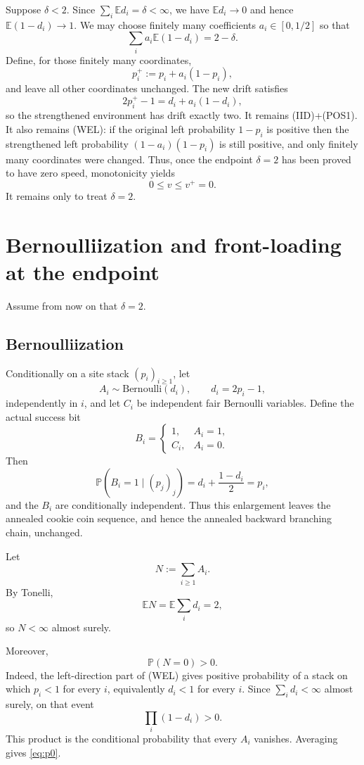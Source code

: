 \documentclass[11pt]{article}
\newcommand{\E}{\mathbb E}
\newcommand{\Pp}{\mathbb P}
\begin{document}
Suppose $\delta<2$.  Since $\sum_i\E d_i=\delta<\infty$, we have $\E d_i\to0$ and hence $\E(1-d_i)\to1$.  We may choose finitely many coefficients $a_i\in[0,1/2]$ so that
\[
 \sum_i a_i\E(1-d_i)=2-\delta.
\]
Define, for those finitely many coordinates,
\[
 p_i^+:=p_i+a_i(1-p_i),
\]
and leave all other coordinates unchanged.  The new drift satisfies
\[
 2p_i^+-1=d_i+a_i(1-d_i),
\]
so the strengthened environment has drift exactly two.  It remains (IID)+(POS1).  It also remains (WEL): if the original left probability $1-p_i$ is positive then the strengthened left probability $(1-a_i)(1-p_i)$ is still positive, and only finitely many coordinates were changed.  Thus, once the endpoint $\delta=2$ has been proved to have zero speed, monotonicity yields
\[
 0\le v\le v^+=0.
\]
It remains only to treat $\delta=2$.

\section{Bernoulliization and front-loading at the endpoint}

Assume from now on that $\delta=2$.

\subsection{Bernoulliization}

Conditionally on a site stack $(p_i)_{i\ge1}$, let
\[
 A_i\sim\mathrm{Bernoulli}(d_i),\qquad d_i=2p_i-1,
\]
independently in $i$, and let $C_i$ be independent fair Bernoulli variables.  Define the actual success bit
\[
 B_i=\begin{cases}
 1,&A_i=1,\\
 C_i,&A_i=0.
 \end{cases}
\]
Then
\[
 \Pp(B_i=1\mid(p_j)_j)=d_i+\frac{1-d_i}{2}=p_i,
\]
and the $B_i$ are conditionally independent.  Thus this enlargement leaves the annealed cookie coin sequence, and hence the annealed backward branching chain, unchanged.

Let
\[
 N:=\sum_{i\ge1}A_i.
\]
By Tonelli,
\[
 \E N=\E\sum_i d_i=2,
\]
so $N<\infty$ almost surely.

Moreover,
\begin{equation}\label{eq:p0}
 \Pp(N=0)>0.
\end{equation}
Indeed, the left-direction part of (WEL) gives positive probability of a stack on which $p_i<1$ for every $i$, equivalently $d_i<1$ for every $i$.  Since $\sum_i d_i<\infty$ almost surely, on that event
\[
 \prod_i(1-d_i)>0.
\]
This product is the conditional probability that every $A_i$ vanishes.  Averaging gives \eqref{eq:p0}.
\end{document}
